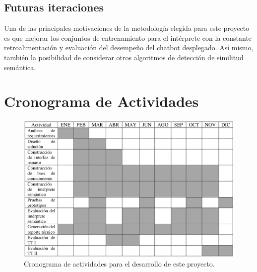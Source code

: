 \subsection{Futuras iteraciones}

Una de las principales motivaciones de la metodología elegida para este proyecto es que mejorar los conjuntos de entrenamiento para el intérprete con la constante retroalimentación y evaluación del desempeño del chatbot desplegado. Así mismo, también la posibilidad de considerar otros algoritmos de detección de similitud semántica.

\section{Cronograma de Actividades}

\begin{figure}[ht]
    \centering
    \includegraphics[scale=0.38]{images/4/cronograma}
    \caption{Cronograma de actividades para el desarrollo de este proyecto.}
    \label{fig:cronograma}
\end{figure}
